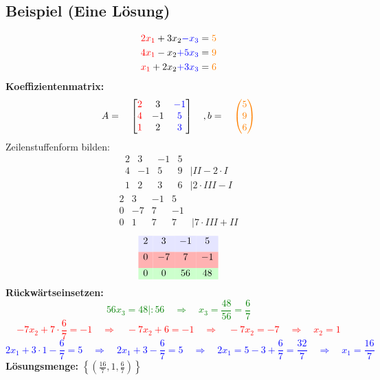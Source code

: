 \documentclass[12pt,a4paper]{article}
\begin{document}
\subsection{Beispiel (Eine Lösung)}
\begin{align*}
\textcolor{red}{2x_1} + 3x_2 \textcolor{blue}{-x_3} &= \textcolor{orange}{5} \\
\textcolor{red}{4x_1} - x_2 \textcolor{blue}{+ 5x_3} &= \textcolor{orange}{9} \\
\textcolor{red}{x_1} + 2x_2 \textcolor{blue}{+ 3x_3} &= \textcolor{orange}{6}
\end{align*}
\textbf{Koeffizientenmatrix:}
\[
A =
\quad
\begin{bmatrix}
\textcolor{red}{2} & 3 & \textcolor{blue}{-1} \\
\textcolor{red}{4} & -1 & \textcolor{blue}{5} \\
\textcolor{red}{1} & 2 & \textcolor{blue}{3}
\end{bmatrix}
\quad
, b =
\quad
\textcolor{orange}{
\begin{pmatrix}
5 \\
9 \\
6
\end{pmatrix}
}
\]
Zeilenstuffenform bilden:
\[
\begin{matrix}
2 & 3 & -1 & 5 \\
4 & -1 & 5 & 9 & \vert II - 2 \cdot I \\
1 & 2 & 3 & 6 & \vert 2 \cdot III - I
\end{matrix}
\]
\[
\begin{matrix}
2 & 3 & -1 & 5 \\
0 & -7 & 7 & -1 \\
0 & 1 & 7 & 7 & \vert 7 \cdot III + II
\end{matrix}
\]
\[
\begin{array}{cccc}
\rowcolor{blue!10}
2 & 3 & -1 & 5 \\[5pt]
\rowcolor{red!30}
0 & -7 & 7 & -1 \\[5pt]
\rowcolor{green!20}
0 & 0 & 56 & 48
\end{array}
\]
\textbf{Rückwärtseinsetzen:} \\
\textcolor{green}{
\[
    56x_3 = 48 \vert :56
    \quad \Rightarrow \quad
    x_3 = \frac{48}{56} = \frac{6}{7} 
\]
}
\textcolor{red}{
\[
-7x_2 + 7 \cdot \frac{6}{7} = -1 \quad \Rightarrow \quad -7x_2 + 6 = -1 \quad \Rightarrow \quad -7x_2 = -7 \quad \Rightarrow \quad x_2 = 1
\]
}
\textcolor{blue}{
\[
2x_1 + 3 \cdot 1 - \frac{6}{7} = 5 \quad \Rightarrow \quad 2x_1 + 3 - \frac{6}{7} = 5 \quad \Rightarrow \quad 2x_1 = 5 - 3 + \frac{6}{7} = \frac{32}{7} \quad \Rightarrow \quad x_1 = \frac{16}{7}
\]
}
\textbf{Lösungsmenge:} $\left\{ \left( \frac{16}{7}, 1, \frac{6}{7} \right) \right\}$
\end{document}
